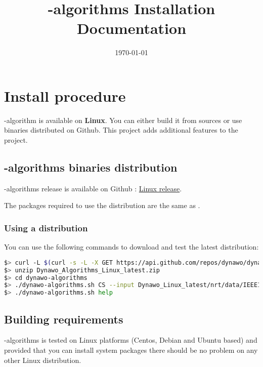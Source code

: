 \documentclass[a4paper, 12pt]{report}
\begin{document}
\title{\Dynawo-algorithms Installation Documentation}
\date\today

\maketitle
\tableofcontents

\chapter{Install procedure}

\Dynawo-algorithm is available on \textbf{Linux}. 
You can either build it from sources or use binaries distributed on Github.
This project adds additional features to the \href{https://github.com/dynawo/dynawo}{\Dynawo} project.

\section{\Dynawo-algorithms binaries distribution}

\Dynawo-algorithms release is available on Github : \href{https://github.com/dynawo/dynawo-algorithms/releases/download/v1.3.0/Dynawo_Algorithms_Linux_v1.3.0.zip}{Linux release}.

The packages required to use the distribution are the same as \Dynawo.

\subsection{Using a distribution}

You can use the following commands to download and test the latest distribution:
\begin{lstlisting}[language=bash, breaklines=true, breakatwhitespace=false]
$> curl -L $(curl -s -L -X GET https://api.github.com/repos/dynawo/dynawo-algorithms/releases/latest | grep "Dynawo_Algorithms_Linux" | grep url | cut -d '"' -f 4) -o Dynawo_Algorithms_Linux_latest.zip
$> unzip Dynawo_Algorithms_Linux_latest.zip
$> cd dynawo-algorithms
$> ./dynawo-algorithms.sh CS --input Dynawo_Linux_latest/nrt/data/IEEE14/IEEE14_BlackBoxModels/IEEE14.jobs
$> ./dynawo-algorithms.sh help
\end{lstlisting}

\section{Building requirements}

\Dynawo-algorithms is tested on Linux platforms (Centos, Debian and Ubuntu based) and provided that you can install system packages there should be no problem on any other Linux distribution. 
\end{document}
